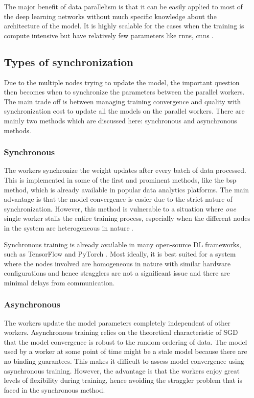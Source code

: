 The major benefit of data parallelism is that it can be easily applied to most of the deep learning networks without much specific knowledge about the architecture of the model. It is highly scalable for the cases when the training is compute intensive but have relatively few parameters like \acrshort{rnn}s, \acrshort{cnn}s \cite{Krizhevsky2014OneNetworks}.


\subsection{Types of synchronization}
Due to the multiple nodes trying to update the model, the important question then becomes when to synchronize the parameters between the parallel workers. The main trade off is between managing training convergence and quality with synchronization cost to update all the models on the parallel workers. There are mainly two methods which are discussed here: synchronous and asynchronous methods.

\subsubsection{Synchronous}
The workers synchronize the weight updates after every batch of data processed. This is implemented in some of the first and prominent methods, like the \acrfull{bsp} \cite{Valiant1990AComputation} method, which is already available in popular data analytics platforms. The main advantage is that the model convergence is easier due to the strict nature of synchronization. However, this method is vulnerable to a situation where \emph{one} single worker stalls the entire training process, especially when the different nodes in the system are heterogeneous in nature \cite{Cipar2013SolvingStaleness}.

Synchronous training is already available in many open-source DL frameworks, such
as TensorFlow \cite{Abadi2016TensorFlow:Systems} and PyTorch \cite{Paszke2019PyTorch:Library}. Most ideally, it is best suited for a system where the nodes involved are homogeneous in nature with similar hardware configurations and hence stragglers are not a significant issue and there are minimal delays from communication.

\subsubsection{Asynchronous}
\label{section:hogwild}
The workers update the model parameters completely independent of other workers. Asynchronous training relies on the theoretical characteristic of SGD that the model convergence is robust to the random ordering of data. The model used by a worker at some point of time might be a stale model because there are no binding guarantees. This makes it difficult to assess model convergence using asynchronous training. However, the advantage is that the workers enjoy great levels of flexibility during training, hence avoiding the straggler problem that is faced in the synchronous method.


